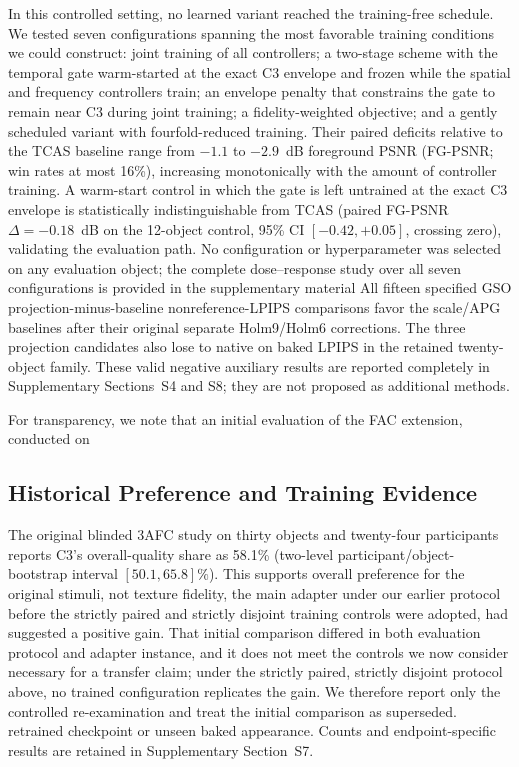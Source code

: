 \documentclass[times,twocolumn,final]{elsarticle}
\providecommand{\DIFadd}[1]{{\protect\color{blue} \sf #1}} %
\providecommand{\DIFdel}[1]{{\protect\color{red} \scriptsize #1}} %
\providecommand{\DIFaddbegin}{} %
\providecommand{\DIFaddend}{} %
\providecommand{\DIFdelbegin}{} %
\providecommand{\DIFdelend}{} %
\begin{document}
\DIFdelbegin \DIFdel{In this controlled setting, no learned variant reached the training-free schedule.
We tested seven configurations spanning the most favorable training conditions we could construct: joint training of all controllers; a two-stage scheme with the temporal gate warm-started at the exact C3 envelope and frozen while the spatial and frequency controllers train; an envelope penalty that constrains the gate to remain near C3 during joint training; a fidelity-weighted objective; and a gently scheduled variant with fourfold-reduced training. Their paired deficits relative to the TCAS baseline range from $-1.1$ to $-2.9$~dB foreground PSNR (FG-PSNR; win rates at most 16\%), increasing monotonically with the amount of controller training. A warm-start control in which the gate is left untrained at the exact C3 envelope is statistically indistinguishable from TCAS (paired FG-PSNR $\Delta=-0.18$~dB on the 12-object control, 95\% CI $[-0.42,+0.05]$, crossing zero), validating the evaluation path. No configuration or hyperparameter was selected on any evaluation object; the complete dose--response study over all seven configurations is provided in the supplementary material}\DIFdelend \DIFaddbegin \DIFadd{All fifteen specified GSO projection-minus-baseline nonreference-LPIPS comparisons favor the scale/APG baselines after their original separate Holm9/Holm6 corrections. The three projection candidates also lose to native on baked LPIPS in the retained twenty-object family. These valid negative auxiliary results are reported completely in Supplementary Sections~S4 and S8; they are not proposed as additional methods}\DIFaddend .

\DIFdelbegin \DIFdel{For transparency, we note that an initial evaluation of the FAC extension, conducted on }\DIFdelend \DIFaddbegin \subsection{Historical Preference and Training Evidence}
\label{subsec:preference}
\DIFadd{The original blinded 3AFC study on thirty objects and twenty-four participants reports C3's overall-quality share as 58.1\% (two-level participant/object-bootstrap interval $[50.1,65.8]\%$). This supports overall preference for the original stimuli, not texture fidelity, }\DIFaddend the \DIFdelbegin \DIFdel{main adapter under our earlier protocol before the strictly paired and strictly disjoint training controls were adopted, had suggested a positive gain. That initial comparison differed in both evaluation protocol and adapter instance, and it does not meet the controls we now consider necessary for a transfer claim; under the strictly paired, strictly disjoint protocol above, no trained configuration replicates the gain. We therefore report only the controlled re-examination and treat the initial comparison as superseded.
}\DIFdelend \DIFaddbegin \DIFadd{retrained checkpoint or unseen baked appearance. Counts and endpoint-specific results are retained in Supplementary Section~S7.
}\DIFaddend 
\end{document}
